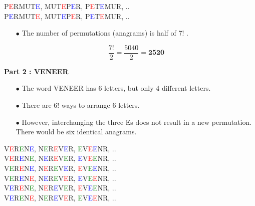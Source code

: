 \documentclass[]{report}
\begin{document}
	\begin{center}
		P\textcolor{red}{E}RMUT\textcolor{blue}{E}, \; MUT\textcolor{red}{E}P\textcolor{blue}{E}R, \; P\textcolor{red}{E}T\textcolor{blue}{E}MUR,\; ..\\
		P\textcolor{blue}{E}RMUT\textcolor{red}{E}, \; MUT\textcolor{blue}{E}P\textcolor{red}{E}R, \; P\textcolor{blue}{E}T\textcolor{red}{E}MUR,\; ..
	\end{center}
	
	
	\begin{itemize}
		\item[$\bullet$]  The number of permutations (anagrams) is half of 7! .
		
		\[\frac{7!}{2} =  \frac{5040}{2} = \boldsymbol{2520} \]
	\end{itemize}
	\textbf{Part 2 : VENEER}\\
	\begin{itemize}
		\item[$\bullet$] The word VENEER has 6 letters, but only 4 different letters. 
		\item[$\bullet$] There are 6! ways to arrange 6 letters.
		\item[$\bullet$] However, interchanging the three Es does not result in a new permutation. There would be six identical anagrams.
	\end{itemize}
	
	\begin{center}
V\textcolor{red}{E}R\textcolor{green}{E}N\textcolor{blue}{E}, \; N\textcolor{green}{E}R\textcolor{red}{E}V\textcolor{blue}{E}R, \; \textcolor{green}{E}V\textcolor{red}{E}\textcolor{blue}{E}NR,\; ..\\
V\textcolor{red}{E}R\textcolor{blue}{E}N\textcolor{green}{E}, \; N\textcolor{blue}{E}R\textcolor{red}{E}V\textcolor{green}{E}R, \; \textcolor{blue}{E}V\textcolor{red}{E}\textcolor{green}{E}NR,\; ..\\
V\textcolor{green}{E}R\textcolor{red}{E}N\textcolor{blue}{E}, \; N\textcolor{red}{E}R\textcolor{green}{E}V\textcolor{blue}{E}R, \; \textcolor{red}{E}V\textcolor{green}{E}\textcolor{blue}{E}NR,\; ..\\
V\textcolor{green}{E}R\textcolor{blue}{E}N\textcolor{red}{E}, \; N\textcolor{blue}{E}R\textcolor{green}{E}V\textcolor{red}{E}R, \; \textcolor{blue}{E}V\textcolor{green}{E}\textcolor{red}{E}NR,\; ..\\

V\textcolor{blue}{E}R\textcolor{red}{E}N\textcolor{green}{E}, \; N\textcolor{red}{E}R\textcolor{blue}{E}V\textcolor{green}{E}R, \; \textcolor{red}{E}V\textcolor{blue}{E}\textcolor{green}{E}NR,\; ..\\
V\textcolor{blue}{E}R\textcolor{green}{E}N\textcolor{red}{E}, \; N\textcolor{green}{E}R\textcolor{blue}{E}V\textcolor{red}{E}R, \; \textcolor{green}{E}V\textcolor{blue}{E}\textcolor{red}{E}NR,\; ..\\
	\end{center}
	
\end{document}
